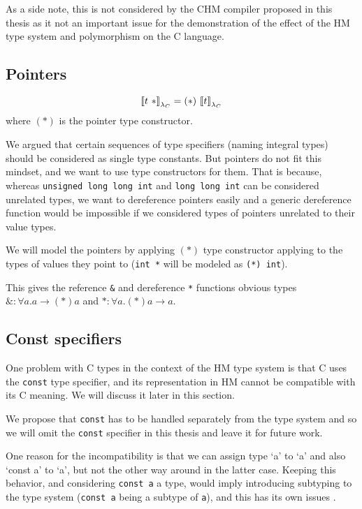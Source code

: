 As a side note, this is not considered by the CHM compiler proposed in this thesis as it not an important issue for the demonstration of the effect of the HM type system and polymorphism on the C language.

\subsection{Pointers}

\begin{defn}
    $$\lambdac{t\ *} = (*)\ \lambdac{t}$$
    where $(*)$ is the pointer type constructor.
\end{defn}

We argued that certain sequences of type specifiers (naming integral types) should be considered as single type constants. But pointers do not fit this mindset, and we want to use type constructors for them. That is because, whereas \lstinline{unsigned long long int} and \lstinline{long long int} can be considered unrelated types, we want to dereference pointers easily and a generic dereference function would be impossible if we considered types of pointers unrelated to their value types.

We will model the pointers by applying $(*)$ type constructor applying to the types of values they point to (\lstinline{int *} will be modeled as \lstinline{(*) int}).

This gives the reference \lstinline{&} and dereference \lstinline{*} functions obvious types $\&: \forall a . a \rightarrow (*) a$ and $*: \forall a . (*) a \rightarrow a$.

\subsection{Const specifiers}

One problem with C types in the context of the HM type system is that C uses the \lstinline{const} type specifier, and its representation in HM cannot be compatible with its C meaning. We will discuss it later in this section.

We propose that \lstinline{const} has to be handled separately from the type system and so we will omit the \lstinline{const} specifier in this thesis and leave it for future work.

One reason for the incompatibility is that we can assign type `a' to `a' and also `const a' to `a', but not the other way around in the latter case. Keeping this behavior, and considering \lstinline{const a} a type, would imply introducing subtyping to the type system (\lstinline{const a} being a subtype of \lstinline{a}), and this has its own issues \cite{palsberg2012overloading}.

